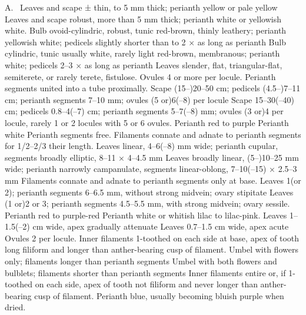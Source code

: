 \documentclass{ctexart}
\begin{document}
\begin{Key*}{A.~}
\alter Leaves and scape ± thin, to 5 mm thick; perianth yellow or pale yellow
\alter Leaves and scape robust, more than 5 mm thick; perianth white or yellowish white.
\alter Bulb ovoid-cylindric, robust, tunic red-brown, thinly leathery; perianth yellowish white; pedicels slightly shorter than to 2 × as long as perianth
\alter Bulb cylindric, tunic usually white, rarely light red-brown, membranous; perianth white; pedicels 2--3 × as long as perianth
\alter Leaves slender, flat, triangular-flat, semiterete, or rarely terete, fistulose.
\alter Ovules 4 or more per locule.
\alter Perianth segments united into a tube proximally.
\alter Scape (15--)20--50 cm; pedicels (4.5--)7--11 cm; perianth segments 7--10 mm; ovules (5 or)6(--8) per locule
\alter Scape 15--30(--40) cm; pedicels 0.8--4(--7) cm; perianth segments 5--7(--8) mm; ovules (3 or)4 per locule, rarely 1 or 2 locules with 5 or 6 ovules.
\alter Perianth red to purple
\alter Perianth white
\alter Perianth segments free.
\alter Filaments connate and adnate to perianth segments for 1/2--2/3 their length.
\alter Leaves linear, 4--6(--8) mm wide; perianth cupular, segments broadly elliptic, 8--11 × 4--4.5 mm
\alter Leaves broadly linear, (5--)10--25 mm wide; perianth narrowly campanulate, segments linear-oblong, 7--10(--15) × 2.5--3 mm
\alter Filaments connate and adnate to perianth segments only at base.
\alter Leaves 1(or 2); perianth segments 6--6.5 mm, without strong midvein; ovary stipitate
\alter Leaves (1 or)2 or 3; perianth segments 4.5--5.5 mm, with strong midvein; ovary sessile.
\alter Perianth red to purple-red
\alter Perianth white or whitish lilac to lilac-pink.
\alter Leaves 1--1.5(--2) cm wide, apex gradually attenuate
\alter Leaves 0.7--1.5 cm wide, apex acute
\alter Ovules 2 per locule.
\alter Inner filaments 1-toothed on each side at base, apex of tooth long filiform and longer than anther-bearing cusp of filament.
\alter Umbel with flowers only; filaments longer than perianth segments
\alter Umbel with both flowers and bulblets; filaments shorter than perianth segments
\alter Inner filaments entire or, if 1-toothed on each side, apex of tooth not filiform and never longer than anther-bearing cusp of filament.
\alter Perianth blue, usually becoming bluish purple when dried.

\end{Key*}
\end{document}
